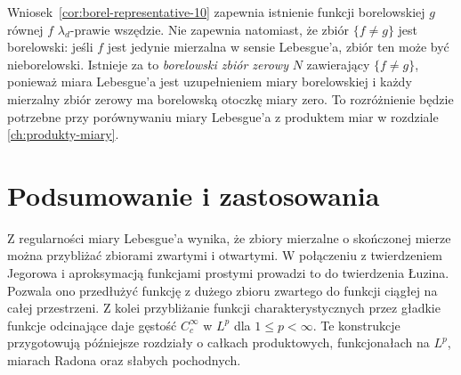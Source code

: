 \begin{uwaga}
\label{rem:borel-null-representatives-10}
Wniosek~\ref{cor:borel-representative-10} zapewnia
istnienie funkcji borelowskiej $g$ równej $f$
$\lambda_d$-prawie wszędzie. Nie zapewnia natomiast,
że zbiór $\{f\ne g\}$ jest borelowski: jeśli $f$
jest jedynie mierzalna w sensie Lebesgue'a,
zbiór ten może być nieborelowski. Istnieje za to
\emph{borelowski zbiór zerowy} $N$ zawierający
$\{f\ne g\}$, ponieważ miara Lebesgue'a jest
uzupełnieniem miary borelowskiej i każdy mierzalny
zbiór zerowy ma borelowską otoczkę miary zero.
To rozróżnienie będzie potrzebne przy porównywaniu
miary Lebesgue'a z produktem miar w rozdziale
\ref{ch:produkty-miary}.
\end{uwaga}

\section{Podsumowanie i zastosowania}

Z regularności miary Lebesgue'a wynika, że zbiory
mierzalne o skończonej mierze można przybliżać
zbiorami zwartymi i otwartymi. W połączeniu z
twierdzeniem Jegorowa i aproksymacją funkcjami
prostymi prowadzi to do twierdzenia Łuzina.
Pozwala ono przedłużyć funkcję z dużego zbioru
zwartego do funkcji ciągłej na całej przestrzeni.
Z kolei przybliżanie funkcji charakterystycznych
przez gładkie funkcje odcinające daje gęstość
$C_c^\infty$ w $L^p$ dla $1\le p<\infty$.
Te konstrukcje przygotowują późniejsze rozdziały
o całkach produktowych, funkcjonałach na $L^p$,
miarach Radona oraz słabych pochodnych.
